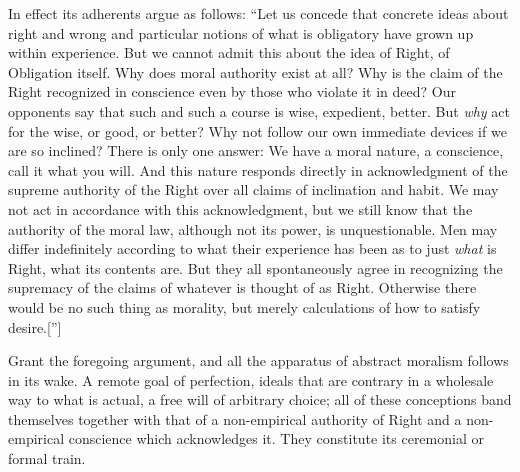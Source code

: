 
In effect its adherents argue as follows: ``Let us concede
that concrete ideas about right and wrong and particular notions of
what is obligatory have grown up within experience. But we cannot
admit this about the idea of Right, of Obligation itself. Why does
moral authority exist at all? Why is the claim of the Right recognized
in conscience even by those who violate it in deed? Our opponents say
that such and such a course is wise, expedient, better. But
\textit{why} act for the wise, or good, or better? Why not follow our
own immediate devices if we are so inclined? There is only one answer:
We have a moral nature, a conscience, call it what you will. And this
nature responds directly in acknowledgment of the supreme authority of
the Right over all claims of inclination and habit. We may not act in
accordance with this acknowledgment, but we still know that the
authority of the moral law, although not its power, is unquestionable.
Men may differ indefinitely according to what their experience has
been as to just \textit{what} is Right, what its contents are. But
they all spontaneously agree in recognizing the supremacy of the
claims of whatever is thought of as Right. Otherwise there would be no
such thing as morality, but merely calculations of how to satisfy
desire.['']

Grant the foregoing argument, and all the apparatus of abstract
moralism follows in its wake. A remote goal of perfection, ideals that
are contrary in a wholesale way to what is actual, a free will of
arbitrary choice; all of these conceptions band themselves together
with that of a non-empirical authority of Right  and a
non-empirical conscience which acknowledges it. They constitute its
ceremonial or formal train.


